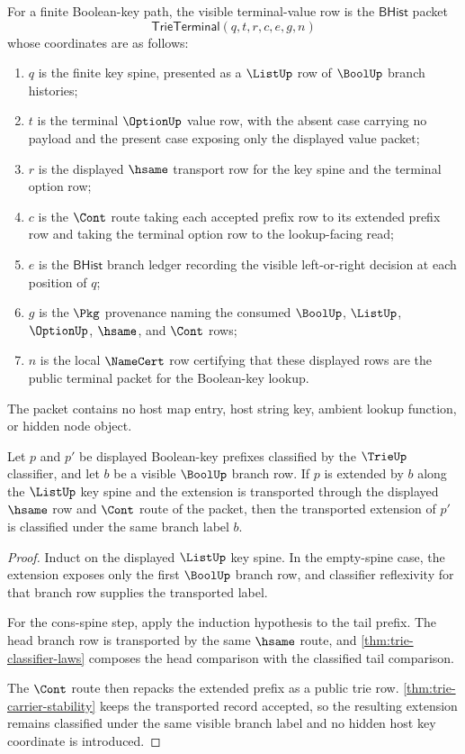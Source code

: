 \begin{definition}\label{def:trie-terminal-value-packet}
For a finite Boolean-key path, the visible terminal-value row is the
$\mathsf{BHist}$ packet
$$
\mathsf{TrieTerminal}(q,t,r,c,e,g,n)
$$
whose coordinates are as follows:
\begin{enumerate}
\item $q$ is the finite key spine, presented as a $\ListUp$ row of $\BoolUp$
branch histories;
\item $t$ is the terminal $\OptionUp$ value row, with the absent case carrying
no payload and the present case exposing only the displayed value packet;
\item $r$ is the displayed $\hsame$ transport row for the key spine and the
terminal option row;
\item $c$ is the $\Cont$ route taking each accepted prefix row to its extended
prefix row and taking the terminal option row to the lookup-facing read;
\item $e$ is the $\mathsf{BHist}$ branch ledger recording the visible
left-or-right decision at each position of $q$;
\item $g$ is the $\Pkg$ provenance naming the consumed $\BoolUp$, $\ListUp$,
$\OptionUp$, $\hsame$, and $\Cont$ rows;
\item $n$ is the local $\NameCert$ row certifying that these displayed rows are
the public terminal packet for the Boolean-key lookup.
\end{enumerate}
The packet contains no host map entry, host string key, ambient lookup
function, or hidden node object.
\end{definition}

\begin{theorem}\label{thm:trie-prefix-extension-classifier-stability}
Let $p$ and $p'$ be displayed Boolean-key prefixes classified by the
$\TrieUp$ classifier, and let $b$ be a visible $\BoolUp$ branch row. If $p$ is
extended by $b$ along the $\ListUp$ key spine and the extension is transported
through the displayed $\hsame$ row and $\Cont$ route of the packet, then the
transported extension of $p'$ is classified under the same branch label $b$.
\end{theorem}
\begin{proof}
Induct on the displayed $\ListUp$ key spine. In the empty-spine case, the
extension exposes only the first $\BoolUp$ branch row, and classifier
reflexivity for that branch row supplies the transported label.

For the cons-spine step, apply the induction hypothesis to the tail prefix.
The head branch row is transported by the same $\hsame$ route, and
\autoref{thm:trie-classifier-laws} composes the head comparison with the
classified tail comparison.

The $\Cont$ route then repacks the extended prefix as a public trie row.
\autoref{thm:trie-carrier-stability} keeps the transported record accepted,
so the resulting extension remains classified under the same visible branch
label and no hidden host key coordinate is introduced.
\end{proof}

